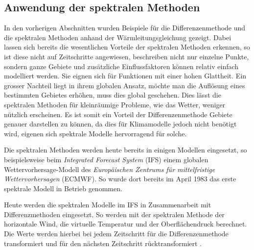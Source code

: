 \begin{refsection}
\subsection{Anwendung der spektralen Methoden}
In den vorherigen Abschnitten wurden Beispiele für die Differenzenmethode und die spektralen Methoden anhand der Wärmleitungsgleichung gezeigt. Dabei lassen sich bereits die wesentlichen Vorteile der spektralen Methoden erkennen, so ist diese nicht auf Zeitschritte angewiesen, beschreiben nicht nur einzelne Punkte, sondern ganze Gebiete und zusätzliche Einflussfaktoren können relativ einfach modelliert werden. Sie eignen sich für Funktionen mit einer hohen Glattheit. Ein grosser Nachteil liegt in ihrem globalen Ansatz, möchte man die Auflösung eines bestimmten Gebietes erhöhen, muss dies global geschehen. Dies lässt die spektralen Methoden für kleinräumige Probleme, wie das Wetter, weniger nützlich erscheinen. Es ist somit ein Vorteil der Differenzenmethode Gebiete genauer darstellen zu können, da dies für Klimamodelle jedoch nicht benötigt wird, eigenen sich spektrale Modelle hervorragend für solche.
 
Die spektralen Methoden werden heute bereits in einigen Modellen eingesetzt, so beispielsweise beim {\em Integrated Forecast System} (IFS) einem globalen Wettervorhersage-Modell des {\em Europäischen Zentrums für mittelfristige Wettervorhersagen} (ECMWF). So wurde dort bereits im April 1983 das erste spektrale Modell in Betrieb genommen.

Heute werden die spektralen Modelle im IFS in Zusammenarbeit mit Differenzmethoden eingesetzt. So werden mit der spektralen Methode der horizontale Wind, die virtuelle Temperatur und der Oberflächendruck berechnet. Die Werte werden hierbei bei jedem Zeitschritt für die Differenzenmethode transformiert und für den nächsten Zeitschritt rücktransformiert \cite{klima:ecmwf}.


\printbibliography[heading=subbibliography]
\end{refsection}
